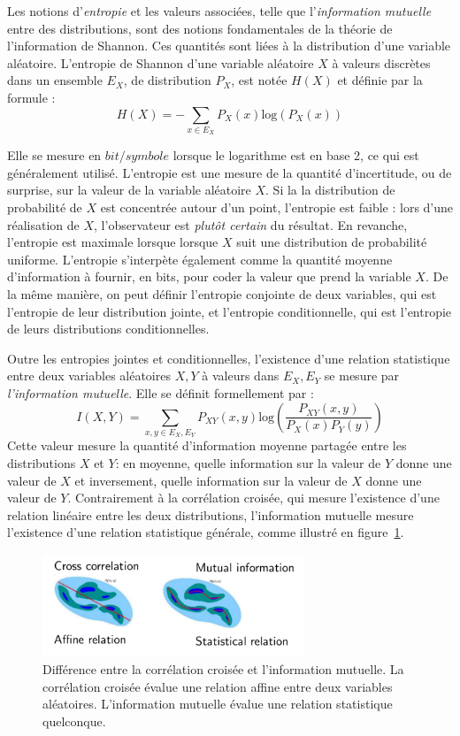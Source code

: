 Les notions d'\emph{entropie} et les valeurs associées, telle que l'\emph{information mutuelle} entre des distributions, sont des notions fondamentales de la théorie de l'information de Shannon. Ces quantités sont liées à la distribution d'une variable aléatoire.
L'entropie de Shannon d'une variable aléatoire $X$ à valeurs discrètes dans un ensemble $E_X$, de distribution $P_X$, est notée $H(X)$ et définie par la formule : 
\begin{equation}
H(X) = - \sum_{x \in E_X}{P_X(x)\textrm{log}(P_X(x))}
\end{equation}

Elle se mesure en $bit/symbole$ lorsque le logarithme est en base 2, ce qui est généralement utilisé. 
L'entropie est une mesure de la quantité d'incertitude, ou de surprise, sur la valeur de la variable aléatoire $X$. Si la la distribution de probabilité de $X$ est concentrée autour d'un point, l'entropie est faible : lors d'une réalisation de $X$, l'observateur est \emph{plutôt certain} du résultat. En revanche, l'entropie est maximale lorsque lorsque $X$ suit une distribution de probabilité uniforme.
L'entropie s'interpète également comme la quantité moyenne d'information à fournir, en bits, pour coder la valeur que prend la variable $X$.
De la même manière, on peut définir l'entropie conjointe de deux variables, qui est l'entropie de leur distribution jointe, et l'entropie conditionnelle, qui est l'entropie de leurs distributions conditionnelles.

Outre les entropies jointes et conditionnelles, l'existence d'une relation statistique entre deux variables aléatoires $X,Y$ à valeurs dans $E_X,E_Y$ se mesure par \emph{l'information mutuelle}. Elle se définit formellement par : 
\begin{equation}
 I(X,Y) = \sum_{x,y \in E_X,E_Y}{P_{XY}(x,y)\textrm{log}(\frac{P_{XY}(x,y)}{P_X(x)P_Y(y)})}
\end{equation}
Cette valeur mesure la quantité d'information moyenne partagée entre les distributions $X$ et $Y$: en moyenne, quelle information sur la valeur de $Y$ donne une valeur de $X$ et inversement, quelle information sur la valeur de $X$ donne une valeur de $Y$.
Contrairement à la corrélation croisée, qui mesure l'existence d'une relation linéaire entre les deux distributions, l'information mutuelle mesure l'existence d'une relation statistique générale, comme illustré en figure~\ref{fig:mi_description}.

\begin{figure}
    \centering
    \includegraphics[width=0.7\textwidth]{mi_description}
    \caption{Différence entre la corrélation croisée et l'information mutuelle. La corrélation croisée évalue une relation affine entre deux variables aléatoires. L'information mutuelle évalue une relation statistique quelconque.\label{fig:mi_description}}
\end{figure}


